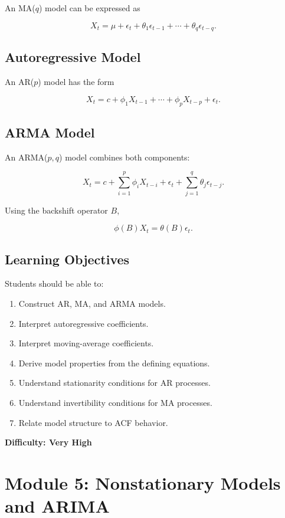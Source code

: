 \documentclass[11pt]{article}
\begin{document}
An MA($q$) model can be expressed as

\[
X_t
=
\mu
+
\epsilon_t
+
\theta_1\epsilon_{t-1}
+\cdots+
\theta_q\epsilon_{t-q}.
\]

\subsection{Autoregressive Model}

An AR($p$) model has the form

\[
X_t
=
c
+
\phi_1X_{t-1}
+\cdots+
\phi_pX_{t-p}
+
\epsilon_t.
\]

\subsection{ARMA Model}

An ARMA($p,q$) model combines both components:

\[
X_t
=
c+
\sum_{i=1}^{p}\phi_iX_{t-i}
+
\epsilon_t
+
\sum_{j=1}^{q}\theta_j\epsilon_{t-j}.
\]

Using the backshift operator $B$,

\[
\phi(B)X_t
=
\theta(B)\epsilon_t.
\]

\subsection{Learning Objectives}

Students should be able to:

\begin{enumerate}
    \item Construct AR, MA, and ARMA models.
    \item Interpret autoregressive coefficients.
    \item Interpret moving-average coefficients.
    \item Derive model properties from the defining equations.
    \item Understand stationarity conditions for AR processes.
    \item Understand invertibility conditions for MA processes.
    \item Relate model structure to ACF behavior.
\end{enumerate}

\textbf{Difficulty: Very High}

\section{Module 5: Nonstationary Models and ARIMA}
\end{document}
